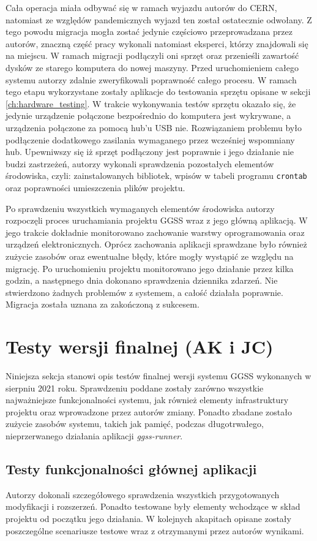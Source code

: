 Cała operacja miała odbywać się w ramach wyjazdu autorów do CERN, natomiast ze względów pandemicznych wyjazd ten został ostatecznie odwołany. Z tego powodu migracja mogła zostać jedynie częściowo przeprowadzana przez autorów, znaczną część pracy wykonali natomiast eksperci, którzy znajdowali się na miejscu. W ramach migracji podłączyli oni sprzęt oraz przenieśli zawartość dysków ze starego komputera do nowej maszyny. Przed uruchomieniem całego systemu autorzy zdalnie zweryfikowali poprawność całego procesu. W ramach tego etapu wykorzystane zostały aplikacje do testowania sprzętu opisane w sekcji \ref{ch:hardware_testing}. W trakcie wykonywania testów sprzętu okazało się, że jedynie urządzenie połączone bezpośrednio do komputera jest wykrywane, a urządzenia połączone za pomocą hub'u USB nie. Rozwiązaniem problemu było podłączenie dodatkowego zasilania wymaganego przez wcześniej wspomniany hub. Upewniwszy się iż sprzęt podłączony jest poprawnie i jego działanie nie budzi zastrzeżeń, autorzy wykonali sprawdzenia pozostałych elementów środowiska, czyli: zainstalowanych bibliotek, wpisów w tabeli programu \lstinline{crontab} oraz poprawności umieszczenia plików projektu.

Po sprawdzeniu wszystkich wymaganych elementów środowiska autorzy rozpoczęli proces uruchamiania projektu GGSS wraz z jego główną aplikacją. W jego trakcie dokładnie monitorowano zachowanie warstwy oprogramowania oraz urządzeń elektronicznych. Oprócz zachowania aplikacji sprawdzane było również zużycie zasobów oraz ewentualne błędy, które mogły wystąpić ze względu na migrację. Po uruchomieniu projektu monitorowano jego działanie przez kilka godzin, a następnego dnia dokonano sprawdzenia dziennika zdarzeń. Nie stwierdzono żadnych problemów z systemem, a całość działała poprawnie. Migracja została uznana za zakończoną z sukcesem.

\section{Testy wersji finalnej (AK i JC)}
Niniejsza sekcja stanowi opis testów finalnej wersji systemu GGSS wykonanych w sierpniu 2021 roku. Sprawdzeniu poddane zostały zarówno wszystkie najważniejsze funkcjonalności systemu, jak również elementy infrastruktury projektu oraz wprowadzone przez autorów zmiany. Ponadto zbadane zostało zużycie zasobów systemu, takich jak pamięć, podczas długotrwałego, nieprzerwanego działania aplikacji \emph{ggss-runner}. 

\subsection{Testy funkcjonalności głównej aplikacji}
Autorzy dokonali szczegółowego sprawdzenia wszystkich przygotowanych modyfikacji i rozszerzeń. Ponadto testowane były elementy wchodzące w skład projektu od początku jego działania. W kolejnych akapitach opisane zostały poszczególne scenariusze testowe wraz z otrzymanymi przez autorów wynikami.

